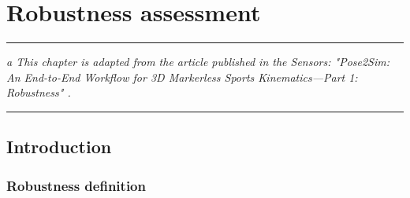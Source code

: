 
\lhead[\fancyplain{}{\leftmark}]%
      {\fancyplain{}{}} %
\chead[\fancyplain{}{}]%
      {\fancyplain{}{}}
\rhead[\fancyplain{}{}]%
      {\fancyplain{}{\rightmark}}%
\lfoot[\fancyplain{}{}]%
      {\fancyplain{}{}}
\cfoot[\fancyplain{}{\thepage}]%
      {\fancyplain{}{\thepage}} %
\rfoot[\fancyplain{}{}]%
     {\fancyplain{}{\scriptsize}}



\chapter{Robustness assessment}
\label{ch:4}


\begin{center}
\rule{0.7\linewidth}{.5pt}
\begin{minipage}{0.7\linewidth}
\smallskip

\textit{a\newline \newline
This chapter is adapted from the article published in the Sensors: "Pose2Sim: An End-to-End Workflow for 3D Markerless Sports Kinematics—Part 1: Robustness" \cite{Pagnon2021}.
}

\end{minipage}
\smallskip
\rule{0.7\linewidth}{.5pt}
\end{center}

\minitoc
\newpage


\section{Introduction}
\subsection{Robustness definition}

